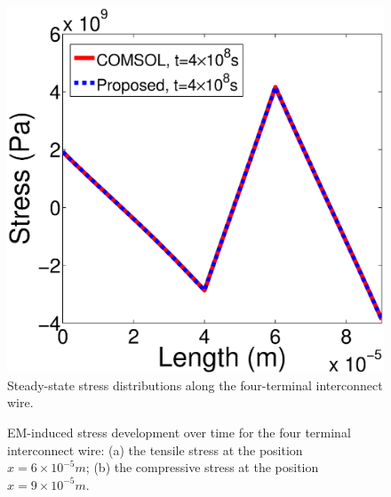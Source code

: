 \begin{figure}[!h]
\centering
\includegraphics[width=0.7\columnwidth]{S3StableT0.eps}
\caption{Steady-state stress distributions along the four-terminal interconnect wire.}
\label{fig:S3StableT0}
\end{figure}

\begin{figure}[!h]
\centering
{}
\caption{EM-induced stress development over time for the four terminal interconnect wire: (a) the tensile stress at the position $x=6\times 10^{-5}m$; (b) the compressive stress at the position $x=9\times 10^{-5}m$.}
\label{fig:S3Results2}
\end{figure}

